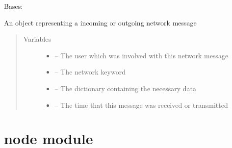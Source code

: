 \documentclass[letterpaper,10pt,english]{sphinxmanual}
\begin{document}
\begin{fulllineitems}
\label{\detokenize{logentry:logentry.LogEntry}}
Bases: 

An object representing a incoming or outgoing network message
\begin{quote}\begin{description}
\item[{Variables}] \leavevmode\begin{itemize}
\item {} 
{\hyperref[\detokenize{user:module-user}]{}} -- The user which was involved with this network message

\item {} 
\href{https://docs.python.org/2/library/keyword.html\#module-keyword}{} -- The network keyword

\item {} 
 -- The dictionary containing the necessary data

\item {} 
 -- The time that this message was received or transmitted

\end{itemize}

\end{description}\end{quote}

\end{fulllineitems}



\section{node module}
\label{\detokenize{node:node-module}}\label{\detokenize{node:module-node}}\label{\detokenize{node::doc}}
\end{document}
